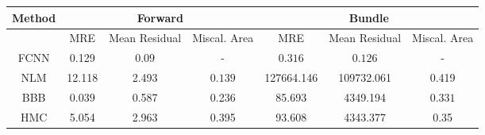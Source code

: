 \documentclass[convert={outext=.png}]{standalone}
\begin{document}
\begin{tabular}{c c c c c c c}
\hline
\hline
Method &  \multicolumn{3}{c}{Forward} & \multicolumn{3}{c}{Bundle} \\ \hline
 & MRE & Mean Residual & Miscal. Area & MRE & Mean Residual & Miscal. Area\\
 FCNN & 0.129 & $\mathbf{0.09}$ & - & $\mathbf{0.316}$ & $\mathbf{0.126}$ & - \\
 \hline
 NLM & 12.118 & 2.493 & $\mathbf{0.139}$ & 127664.146 & 109732.061 & 0.419 \\
 BBB & $\mathbf{0.039}$ & 0.587 & 0.236 & 85.693 & 4349.194 & $\mathbf{0.331}$ \\
 HMC & 5.054 & 2.963 & 0.395 & 93.608 & 4343.377 & 0.35 \\
\hline
\hline
\end{tabular}
\end{document}
